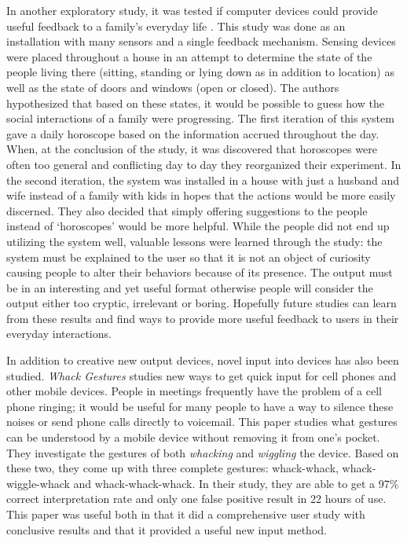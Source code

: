 In another exploratory study, it was tested if computer devices could provide useful feedback to a family's everyday life \cite{1519040}.  This study was done as an installation with many sensors and a single feedback mechanism.  Sensing devices were placed throughout a house in an attempt to determine the state of the people living there (sitting, standing or lying down as in addition to location) as well as the state of doors and windows (open or closed). The authors hypothesized that based on these states, it would be possible to guess how the social interactions of a family were progressing.  The first iteration of this system gave a daily horoscope based on the information accrued throughout the day.  When, at the conclusion of the study, it was discovered that horoscopes were often too general and conflicting day to day they reorganized their experiment.
In the second iteration, the system was installed in a house with just a husband and wife instead of a family with kids in hopes that the actions would be more easily discerned.  They also decided that simply offering suggestions to the people instead of `horoscopes' would be more helpful.  While the people did not end up utilizing the system well, valuable lessons were learned through the study: the system must be explained to the user so that it is not an object of curiosity causing people to alter their behaviors because of its presence.  The output must be in an interesting and yet useful format otherwise people will consider the output either too cryptic, irrelevant or boring.  Hopefully future studies can learn from these results and find ways to provide more useful feedback to users in their everyday interactions.

In addition to creative new output devices, novel input into devices has also been studied.  \emph{Whack Gestures} \cite{1709906} studies new ways to get quick input for cell phones and other mobile devices.  People in meetings frequently have the problem of a cell phone ringing; it would be useful for many people to have a way to silence these noises or send phone calls directly to voicemail.  This paper studies what gestures can be understood by a mobile device without removing it from one's pocket.  They investigate the gestures of both \emph{whacking} and \emph{wiggling} the device.  Based on these two, they come up with three complete gestures: whack-whack, whack-wiggle-whack and whack-whack-whack.  In their study, they are able to get a 97\% correct interpretation rate and only one false positive result in 22 hours of use.  This paper was useful both in that it did a comprehensive user study with conclusive results and that it provided a useful new input method.  


